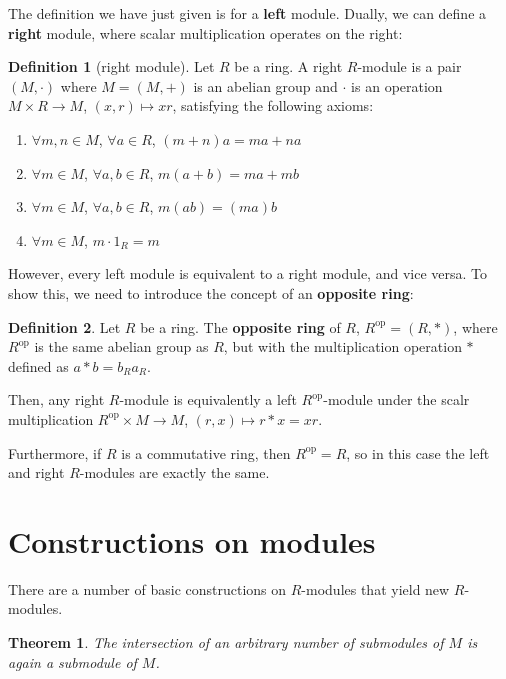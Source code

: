 \documentclass[12pt, a4paper, titlepage]{report}
\theoremstyle{plain} %
\newtheorem{thm}{Theorem}[section]
\theoremstyle{definition}
\newtheorem{defn}{Definition}[section]
\theoremstyle{remark}
\newcommand\opp[1]{{#1}^{\mathrm{op}}}
\begin{document}
The definition we have just given is for a \textbf{left} module. Dually, we can define a \textbf{right} module, where scalar
multiplication operates on the right:

\begin{defn}[right module]
  Let $R$ be a ring. A right $R$-module is a pair $(M, \cdot)$ where $M = (M, +)$ is an abelian group
  and $\cdot$ is an operation $M \times R \rightarrow M$, $(x, r) \mapsto xr$, satisfying the
  following axioms:
  \begin{enumerate}
  \item $\forall m, n \in M$, $\forall a \in R$, $(m + n)a = ma + na$
  \item $\forall m \in M$, $\forall a, b \in R$, $m(a + b) = ma + mb$
  \item $\forall m \in M$, $\forall a, b \in R$, $m(ab) = (ma)b$
  \item $\forall m \in M$, $m \cdot 1_{R} = m$
  \end{enumerate}
\end{defn}

However, every left module is equivalent to a right module, and vice versa. To show this, we need to introduce the concept of an
\textbf{opposite ring}:

\begin{defn}
  Let $R$ be a ring. The \textbf{opposite ring} of $R$, $\opp{R} = (R, \ast)$, where $\opp{R}$ is the same abelian group as $R$, but with the
  multiplication operation $\ast$ defined as $a \ast b = b_Ra_R$.
\end{defn}

Then, any right $R$-module is equivalently a left $\opp{R}$-module under the scalr multiplication $\opp{R} \times M \rightarrow M$,
$(r, x) \mapsto r * x = xr$.

Furthermore, if $R$ is a commutative ring, then $\opp{R} = R$, so in this case the left and right $R$-modules are exactly the same.

\section{Constructions on modules}

There are a number of basic constructions on $R$-modules that yield new $R$-modules.

\begin{thm}
  The intersection of an arbitrary number of submodules of $M$ is again a submodule of $M$.
\end{thm}
\end{document}
